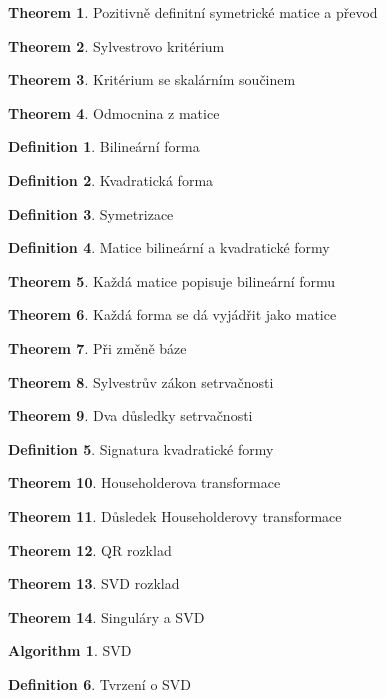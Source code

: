 \documentclass[a4paper]{article}
\theoremstyle{definition}
\newtheorem{definition}{Definition}
\newtheorem{theorem}{Theorem}
\newtheorem{algorithm}{Algorithm}
\begin{document}
\begin{theorem}{Pozitivně definitní symetrické matice a převod} \end{theorem}
\begin{theorem}{Sylvestrovo kritérium} \end{theorem}
\begin{theorem}{Kritérium se skalárním součinem} \end{theorem}
\begin{theorem}{Odmocnina z matice} \end{theorem}
\begin{definition}{Bilineární forma} \end{definition}
\begin{definition}{Kvadratická forma} \end{definition}
\begin{definition}{Symetrizace} \end{definition}
\begin{definition}{Matice bilineární a kvadratické formy} \end{definition}
\begin{theorem}{Každá matice popisuje bilineární formu} \end{theorem}
\begin{theorem}{Každá forma se dá vyjádřit jako matice} \end{theorem}
\begin{theorem}{Při změně báze} \end{theorem}
\begin{theorem}{Sylvestrův zákon setrvačnosti} \end{theorem}
\begin{theorem}{Dva důsledky setrvačnosti} \end{theorem}
\begin{definition}{Signatura kvadratické formy} \end{definition}
\begin{theorem}{Householderova transformace} \end{theorem}
\begin{theorem}{Důsledek Householderovy transformace} \end{theorem}
\begin{theorem}{QR rozklad} \end{theorem}
\begin{theorem}{SVD rozklad} \end{theorem}
\begin{theorem}{Singuláry a SVD} \end{theorem}
\begin{algorithm}{SVD} \end{algorithm}
\begin{definition}{Tvrzení o SVD} \end{definition}
 
\end{document}
